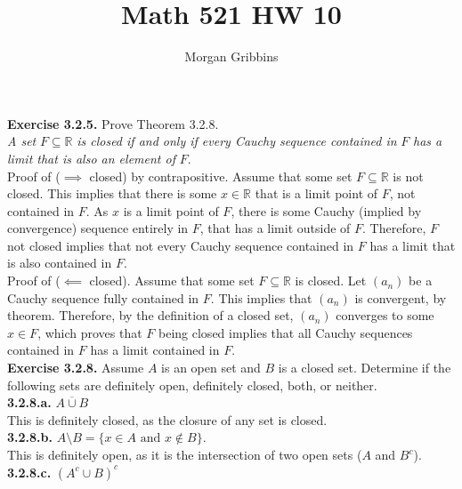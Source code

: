 \documentclass[12pt,letterpaper]{article}
\title{Math 521 HW 10}
\author{Morgan Gribbins}
\date{}
\begin{document}
	
\maketitle

\textbf{Exercise 3.2.5.} Prove Theorem 3.2.8. \\

\textit{A set} \(F \subseteq \mathbb{R}\) \textit{is closed if and only if every Cauchy sequence contained in} \(F\) \textit{has a limit that is also an element of} \(F\). \\

Proof of (\(\implies\) closed) by contrapositive. Assume that some set \(F \subseteq \mathbb{R}\) is not closed. This implies that there is some \(x\in \mathbb{R}\) that is a limit point of \(F\), not contained in \(F\). As \(x\) is a limit point of \(F\), there is some Cauchy (implied by convergence) sequence entirely in \(F\), that has a limit outside of \(F\). Therefore, \(F\) not closed implies that not every Cauchy sequence contained in \(F\) has a limit that is also contained in \(F\). \\

Proof of (\(\impliedby\) closed). Assume that  some set \(F \subseteq \mathbb{R}\) is closed. Let \((a_{n})\) be a Cauchy sequence fully contained in \(F\). This implies that \((a_{n})\) is convergent, by theorem. Therefore, by the definition of a closed set, \((a_{n})\) converges to some \(x \in F\), which proves that \(F\) being closed implies that all Cauchy sequences contained in \(F\) has a limit contained in \(F\). \\

\textbf{Exercise 3.2.8.} Assume \(A\) is an open set and \(B\) is a closed set. Determine if the following sets are definitely open, definitely closed, both, or neither. \\

\textbf{3.2.8.a.} \(\overline{A\cup B}\) \\

This is definitely closed, as the closure of any set is closed. \\

\textbf{3.2.8.b.} \(A\setminus B = \{x \in A \text{ and } x \notin B\}\). \\

This is definitely open, as it is the intersection of two open sets (\(A\) and \(B^{c}\)). \\

\textbf{3.2.8.c.} \((A^{c} \cup B)^{c}\) \\
\end{document}
